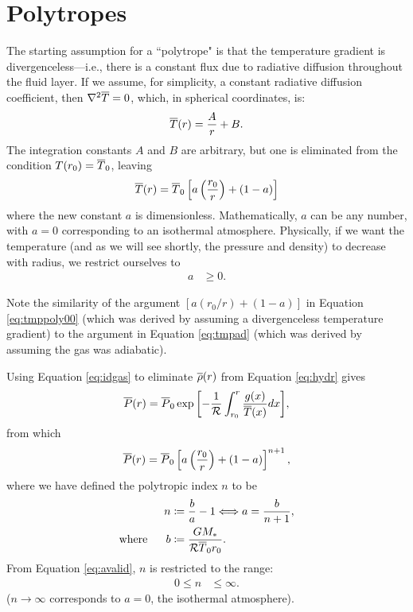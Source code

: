 \documentclass[12pt]{article}
\begin{document}
\section{Polytropes}
The starting assumption for a ``polytrope" is that the temperature gradient is divergenceless---i.e., there is a constant flux due to radiative diffusion throughout the fluid layer. If we assume, for simplicity, a constant radiative diffusion coefficient, then $\nabla^2\overline{T}=0$, which, in spherical coordinates, is: 
\begin{align*}
\overline{T}(r) = \frac{A}{r} + B.
\end{align*}
The integration constants $A$ and $B$ are arbitrary, but one is eliminated from the condition $T(r_0) = \overline{T}_0$, leaving
\begin{align}
\overline{T}(r) = \overline{T}_0 \left[a\left(\frac{r_0}{r}\right) + (1 - a)\right]
\label{eq:tmppoly00}
\end{align}
where the new constant $a$ is dimensionless. Mathematically, $a$ can be any number, with $a=0$ corresponding to an isothermal atmosphere. Physically, if we want the temperature (and as we will see shortly, the pressure and density) to decrease with radius, we restrict ourselves to 
\begin{align}\label{eq:avalid}
	a&\geq0. 
\end{align}

Note the similarity of the argument $[a(r_0/r) + (1-a)]$ in Equation \eqref{eq:tmppoly00} (which was derived by assuming a divergenceless temperature gradient) to the argument in Equation \eqref{eq:tmpad} (which was derived by assuming the gas was adiabatic). 

Using Equation \eqref{eq:idgas} to eliminate $\overline{\rho}(r)$ from Equation \eqref{eq:hydr} gives
\begin{align*}
\overline{P}(r) = \overline{P}_0\exp{\left[-\frac{1}{\mathcal{R}}\int_{r_0}^r\frac{g(x)}{\overline{T}(x)}dx\right]},
\end{align*}
from which
\begin{align*}
\overline{P}(r) = \overline{P}_0\left[a\left(\frac{r_0}{r}\right) + (1 - a)\right]^{n+1},
\end{align*}
where we have defined the polytropic index $n$ to be
\begin{align}
n&\coloneqq \frac{b}{a} - 1 \Longleftrightarrow a = \frac{b}{n+1},\label{eq:npoly}\\
\text{where}\ \ \ \ \  b&\coloneqq \frac{GM_*}{\mathcal{R} \overline{T}_0 r_0}.\label{eq:bpoly}
\end{align}
From Equation \eqref{eq:avalid}, $n$ is restricted to the range:
\begin{align}\label{eq:nvalid}
	0\leq n&\leq\infty. 
\end{align}
($n\rightarrow\infty$ corresponds to $a=0$, the isothermal atmosphere). 
\end{document}

